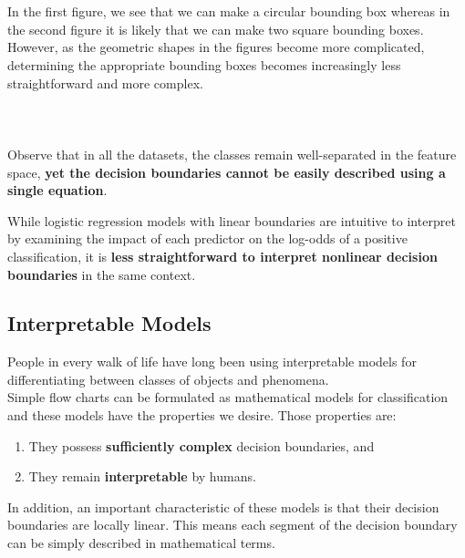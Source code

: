 \documentclass[11pt,a4paper]{report}
\begin{document}
\\\\

In the first figure, we see that we can make a circular bounding box whereas in the second figure it is likely that we can make two square bounding boxes. However, as the geometric shapes in the figures become more complicated, determining the appropriate bounding boxes becomes increasingly less straightforward and more complex.\\\\

\\\\

Observe that in all the datasets, the classes remain well-separated in the feature space, \textbf{yet the decision boundaries cannot be easily described using a single equation}.

While logistic regression models with linear boundaries are intuitive to interpret by examining the impact of each predictor on the log-odds of a positive classification, it is \textbf{less straightforward to interpret nonlinear decision boundaries} in the same context. 

\subsection{Interpretable Models}
People in every walk of life have long been using interpretable models for differentiating between classes of objects and phenomena.\\
Simple flow charts can be formulated as mathematical models for classification and these models have the properties we desire. Those properties are:
\begin{enumerate}
\item They possess \textbf{sufficiently complex} decision boundaries, and
\item They remain \textbf{interpretable} by humans.
\end{enumerate}
In addition, an important characteristic of these models is that their decision boundaries are locally linear. This means each segment of the decision boundary can be simply described in mathematical terms.
\end{document}
